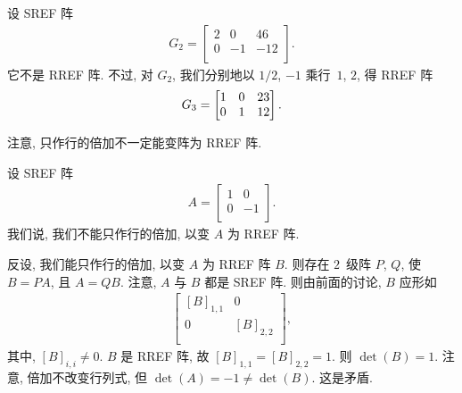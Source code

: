 \documentclass[../libro.tex]{subfiles}
\begin{document}
\begin{example}
    设 SREF 阵
    \begin{align*}
        G_2 =
        \begin{bmatrix}
            2 & 0  & 46  \\
            0 & -1 & -12 \\
        \end{bmatrix}.
    \end{align*}
    它不是 RREF 阵.
    不过, 对 \(G_2\),
    我们分别地以 \(1/2\), \(-1\) 乘行~\(1\), \(2\),
    得 RREF 阵
    \begin{equation*}
        G_3 =
        \begin{bmatrix}
            1 & 0 & 23 \\
            0 & 1 & 12 \\
        \end{bmatrix}.
        \qedhere
    \end{equation*}
\end{example}

注意, 只作行的倍加不一定能变阵为 RREF 阵.

\begin{example}
    设 SREF 阵
    \begin{align*}
        A =
        \begin{bmatrix}
            1 & 0  \\
            0 & -1 \\
        \end{bmatrix}.
    \end{align*}
    我们说, 我们不能只作行的倍加,
    以变 \(A\) 为 RREF 阵.

    反设, 我们能只作行的倍加,
    以变 \(A\) 为 RREF 阵 \(B\).
    则存在 \(2\)~级阵 \(P\), \(Q\),
    使 \(B = P A\), 且 \(A = Q B\).
    注意, \(A\) 与 \(B\) 都是 SREF 阵.
    则由前面的讨论, \(B\) 应形如
    \begin{align*}
        \begin{bmatrix}
            [B]_{1,1} & 0         \\
            0         & [B]_{2,2} \\
        \end{bmatrix},
    \end{align*}
    其中, \([B]_{i,i} \neq 0\).
    \(B\) 是 RREF 阵, 故
    \([B]_{1,1} = [B]_{2,2} = 1\).
    则 \(\det {(B)} = 1\).
    注意, 倍加不改变行列式,
    但 \(\det {(A)} = -1 \neq \det {(B)}\).
    这是矛盾.
\end{example}
\end{document}
